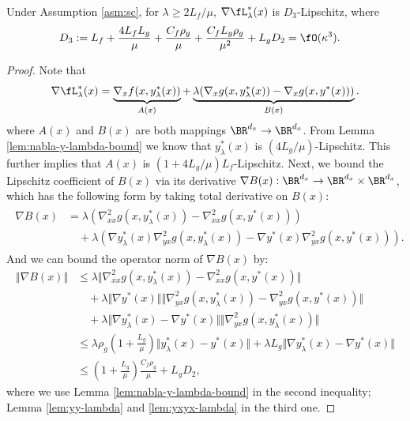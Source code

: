 \begin{lem} \label{lem:nabla2-bound}
Under Assumption \ref{asm:sc}, for $\lambda \ge 2L_f /\mu$, $ \nabla \fL_{\lambda}^*(x)$ is $D_3$-Lipschitz, where
\begin{align*}
    D_3 &:= L_f + \frac{4L_f L_g}{\mu} +\frac{C_f \rho_g}{\mu} +  \frac{C_f L_g \rho_g}{\mu^2} + L_g D_2 = \fO(\kappa^3).
\end{align*}
\end{lem}

\begin{proof}
Note that
\begin{align} \label{eq:nabla-AB}
    \nabla \fL_{\lambda}^*(x) = \underbrace{\nabla_x f(x,y_{\lambda}^*(x))}_{A(x)} + \underbrace{\lambda ( \nabla_x g(x,y_{\lambda}^*(x)) - \nabla_x g(x,y^*(x)))}_{B(x)}. 
\end{align}
where $A(x)$ and $B(x)$ are both mappings  $\BR^{d_x} \rightarrow \BR^{d_x}$. 
From Lemma \ref{lem:nabla-y-lambda-bound} we know that $y_{\lambda}^*(x)$ is $(4L_g/\mu)$-Lipschitz. This further implies that $A(x)$ is  $(1+4L_g/\mu)L_f$-Lipschitz. Next, we bound the Lipschitz  coefficient of $B(x)$ via its derivative $\nabla B(x): \BR^{d_x} \rightarrow \BR^{d_x} \times \BR^{d_x} $, which has the following form by 
taking total derivative on $B(x)$:
\begin{align} \label{eq:nabla-Bx}
\begin{split}
    \nabla B(x) &= 
    \lambda (\nabla_{xx}^2 g(x,y_{\lambda}^*(x))-\nabla_{xx}^2 g(x,y^*(x))) \\
    &\quad + \lambda \left(\nabla y_{\lambda}^*(x)  \nabla_{yx}^2 g(x,y_{\lambda}^*(x)) - \nabla y^*(x) \nabla_{yx}^2 g(x,y^*(x)) \right).
\end{split}
\end{align}
And we can bound the operator norm of $\nabla B(x)$ by:
\begin{align*}
    \Vert \nabla B(x) \Vert &\le  \lambda \Vert \nabla_{xx}^2 g(x,y_{\lambda}^*(x)) - \nabla_{xx}^2 g(x,y^*(x)) \Vert \\
    &\quad + \lambda \Vert \nabla y^*(x) \Vert \Vert \nabla_{yx}^2 g(x,y_{\lambda}^*(x)) - \nabla_{yx}^2 g(x,y^*(x)) \Vert \\
    &\quad  + \lambda \Vert \nabla y_{\lambda}^*(x) - \nabla y^*(x) \Vert \Vert \nabla_{yx}^2 g(x,y_{\lambda}^*(x)) \Vert\\
    &\le  \lambda \rho_g \left(1+ \frac{L_g}{\mu} \right) \Vert y_{\lambda}^*(x) - y^*(x) \Vert +\lambda L_g \Vert \nabla y_{\lambda}^*(x) - \nabla y^*(x) \Vert  \\
    &\le  \left(1+ \frac{L_g}{\mu} \right) \frac{C_f \rho_g}{\mu} +L_g D_2,
\end{align*}
where we use Lemma \ref{lem:nabla-y-lambda-bound}
in the second inequality; Lemma \ref{lem:yy-lambda} and \ref{lem:yxyx-lambda} in the third one.
\end{proof}


